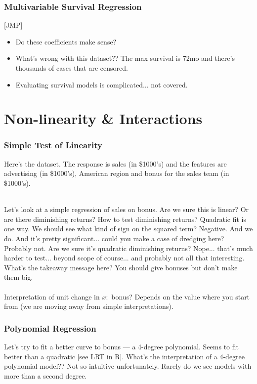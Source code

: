 \documentclass[handout]{beamer}
\begin{document}
\begin{frame}\frametitle{Multivariable Survival Regression}

[JMP] 
\begin{itemize}
\item Do these coefficients make sense? \pause 
\item What's wrong with this dataset?? \pause The max survival is 72mo and there's thousands of cases that are censored. \pause
\item Evaluating survival models is complicated... not covered.
\end{itemize}	
\end{frame}

\section{Non-linearity \& Interactions}

\begin{frame}\frametitle{Simple Test of Linearity}

Here's the  dataset. The response is sales (in \$1000's) and the features are advertising (in \$1000's), American region and bonus for the sales team (in \$1000's). \\~\\ \pause

Let's look at a simple regression of sales on bonus. \pause Are we sure this is linear? Or are there diminishing returns? How to test diminishing returns? \pause Quadratic fit is one way. We should see what kind of sign on the squared term? \pause Negative. And we do. And it's pretty significant... could you make a case of dredging here? \pause Probably not. Are we sure it's quadratic diminishing returns? \pause Nope... that's much harder to test... beyond scope of course... and probably not all that interesting. \pause What's the takeaway message here? \pause You should give bonuses but don't make them  big. \\~\\

\small
Interpretation of unit change in $x:$ bonus? Depends on the value where you start from (we are moving away from simple interpretations).
	
\end{frame}


\begin{frame}\frametitle{Polynomial Regression}

Let's try to fit a better curve to bonus --- a 4-degree polynomial. Seems to fit better than a quadratic [see LRT in R]. What's the interpretation of a 4-degree polynomial model?? \pause Not so intuitive unfortunately. Rarely do we see models with more than a second degree.

\end{frame}
\end{document}
